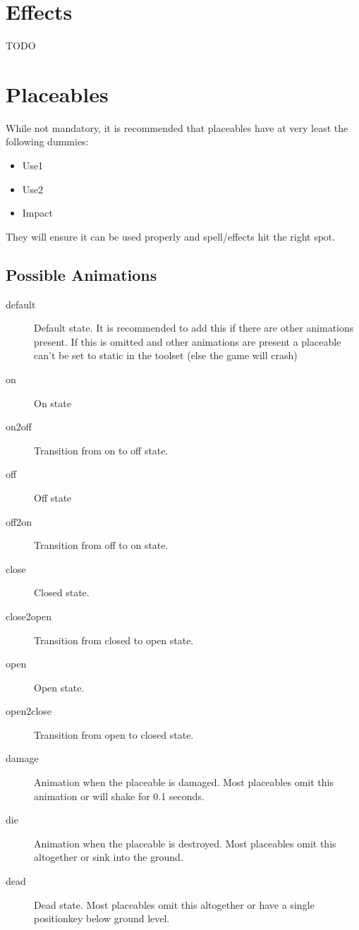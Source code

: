 \section{Effects}
TODO


\section{Placeables}
While not mandatory, it is recommended that placeables have at very least the
following dummies:
\begin{itemize}
	\item Use1
	\item Use2
	\item Impact
\end{itemize}
They will ensure it can be used properly and spell/effects hit the right spot.

\subsection*{Possible Animations}
\begin{description}
    \item[default] Default state. It is recommended to add this if there are other animations present. If this is omitted and other animations are present a placeable can't be set to static in the toolset (else the game will crash)
    \item[on] On state
    \item[on2off] Transition from on to off state.
    \item[off] Off state
    \item[off2on] Transition from off to on state.
    \item[close] Closed state.
    \item[close2open] Transition from closed to open state.
    \item[open] Open state.
    \item[open2close] Transition from open to closed state.
    \item[damage] Animation when the placeable is damaged. Most placeables omit this animation or will shake for 0.1 seconds.
    \item[die] Animation when the placeable is destroyed. Most placeables omit this altogether or sink into the ground.
    \item[dead] Dead state. Most placeables omit this altogether or have a single positionkey below ground level.
\end{description}

